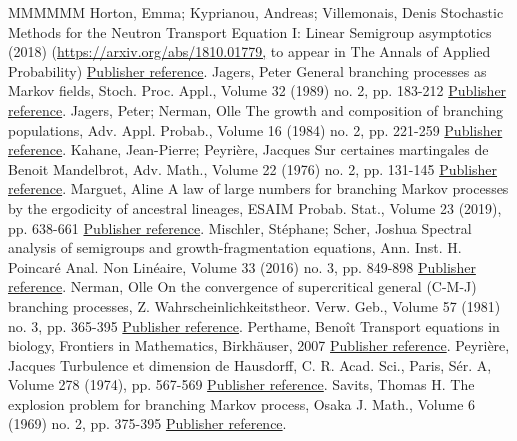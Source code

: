 \begin{thebibliography}{MMMMMM}
 Horton, Emma; Kyprianou, Andreas; Villemonais, Denis Stochastic Methods for the Neutron Transport Equation I: Linear Semigroup asymptotics (2018) (\url{https://arxiv.org/abs/1810.01779,} to appear in The Annals of Applied Probability) \href{https://ahl.centre-mersenne.org/item/AHL_2020__3__795_0/#HKV}{Publisher reference}.
 Jagers, Peter General branching processes as Markov fields, Stoch. Proc. Appl., Volume 32 (1989) no. 2, pp. 183-212 \href{https://ahl.centre-mersenne.org/item/AHL_2020__3__795_0/#Jagers}{Publisher reference}.
 Jagers, Peter; Nerman, Olle The growth and composition of branching populations, Adv. Appl. Probab., Volume 16 (1984) no. 2, pp. 221-259 \href{https://ahl.centre-mersenne.org/item/AHL_2020__3__795_0/#JN84}{Publisher reference}.
 Kahane, Jean-Pierre; Peyrière, Jacques Sur certaines martingales de Benoit Mandelbrot, Adv. Math., Volume 22 (1976) no. 2, pp. 131-145 \href{https://ahl.centre-mersenne.org/item/AHL_2020__3__795_0/#KaP}{Publisher reference}.
 Marguet, Aline A law of large numbers for branching Markov processes by the ergodicity of ancestral lineages, ESAIM Probab. Stat., Volume 23 (2019), pp. 638-661 \href{https://ahl.centre-mersenne.org/item/AHL_2020__3__795_0/#Mar-lln}{Publisher reference}.
 Mischler, Stéphane; Scher, Joshua Spectral analysis of semigroups and growth-fragmentation equations, Ann. Inst. H. Poincaré Anal. Non Linéaire, Volume 33 (2016) no. 3, pp. 849-898 \href{https://ahl.centre-mersenne.org/item/AHL_2020__3__795_0/#MS16}{Publisher reference}.
 Nerman, Olle On the convergence of supercritical general (C-M-J) branching processes, Z. Wahrscheinlichkeitstheor. Verw. Geb., Volume 57 (1981) no. 3, pp. 365-395 \href{https://ahl.centre-mersenne.org/item/AHL_2020__3__795_0/#Nerman}{Publisher reference}.
 Perthame, Benoît Transport equations in biology, Frontiers in Mathematics, Birkhäuser, 2007 \href{https://ahl.centre-mersenne.org/item/AHL_2020__3__795_0/#Per07}{Publisher reference}.
 Peyrière, Jacques Turbulence et dimension de Hausdorff, C. R. Acad. Sci., Paris, Sér. A, Volume 278 (1974), pp. 567-569 \href{https://ahl.centre-mersenne.org/item/AHL_2020__3__795_0/#Pey}{Publisher reference}.
 Savits, Thomas H. The explosion problem for branching Markov process, Osaka J. Math., Volume 6 (1969) no. 2, pp. 375-395 \href{https://ahl.centre-mersenne.org/item/AHL_2020__3__795_0/#Savits}{Publisher reference}.

\end{thebibliography}
